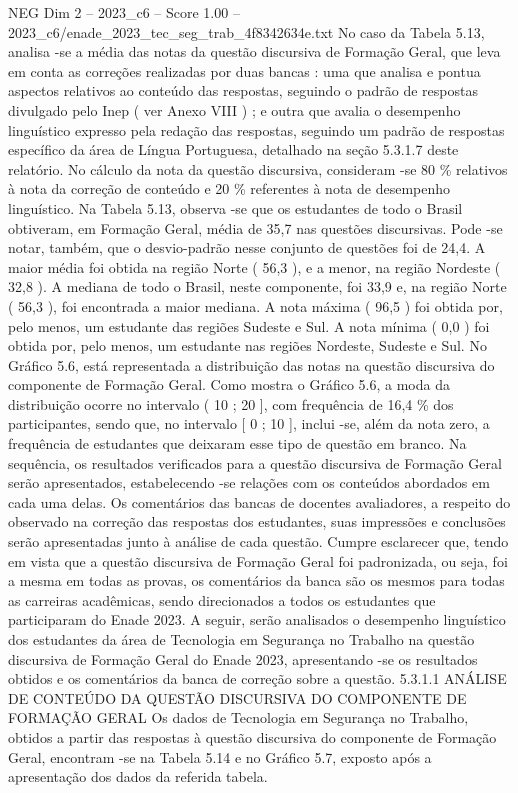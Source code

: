 \begin{textsample}{NEG Dim 2 – 2023\_c6 – Score 1.00 – 2023\_c6/enade\_2023\_tec\_seg\_trab\_4f8342634e.txt}
No caso da Tabela 5.13, analisa -se a média das notas da questão discursiva de Formação Geral, que leva em conta as correções realizadas por duas bancas : uma que analisa e pontua aspectos relativos ao conteúdo das respostas, seguindo o padrão de respostas divulgado pelo Inep ( ver Anexo VIII ) ; e outra que avalia o desempenho linguístico expresso pela redação das respostas, seguindo um padrão de respostas específico da área de Língua Portuguesa, detalhado na seção 5.3.1.7 deste relatório.
No cálculo da nota da questão discursiva, consideram -se 80 \% relativos à nota da correção de conteúdo e 20 \% referentes à nota de desempenho linguístico.
Na Tabela 5.13, observa -se que os estudantes de todo o Brasil obtiveram, em Formação Geral, média de 35,7 nas questões discursivas.
Pode -se notar, também, que o desvio-padrão nesse conjunto de questões foi de 24,4.
A maior média foi obtida na região Norte ( 56,3 ), e a menor, na região Nordeste ( 32,8 ).
A mediana de todo o Brasil, neste componente, foi 33,9 e, na região Norte ( 56,3 ), foi encontrada a maior mediana.
A nota máxima ( 96,5 ) foi obtida por, pelo menos, um estudante das regiões Sudeste e Sul.
A nota mínima ( 0,0 ) foi obtida por, pelo menos, um estudante nas regiões Nordeste, Sudeste e Sul.
No Gráfico 5.6, está representada a distribuição das notas na questão discursiva do componente de Formação Geral.
Como mostra o Gráfico 5.6, a moda da distribuição ocorre no intervalo ( 10 ; 20 ], com frequência de 16,4 \% dos participantes, sendo que, no intervalo [ 0 ; 10 ], inclui -se, além da nota zero, a frequência de estudantes que deixaram esse tipo de questão em branco.
Na sequência, os resultados verificados para a questão discursiva de Formação Geral serão apresentados, estabelecendo -se relações com os conteúdos abordados em cada uma delas.
Os comentários das bancas de docentes avaliadores, a respeito do observado na correção das respostas dos estudantes, suas impressões e conclusões serão apresentadas junto à análise de cada questão.
Cumpre esclarecer que, tendo em vista que a questão discursiva de Formação Geral foi padronizada, ou seja, foi a mesma em todas as provas, os comentários da banca são os mesmos para todas as carreiras acadêmicas, sendo direcionados a todos os estudantes que participaram do Enade 2023.
A seguir, serão analisados o desempenho linguístico dos estudantes da área de Tecnologia em Segurança no Trabalho na questão discursiva de Formação Geral do Enade 2023, apresentando -se os resultados obtidos e os comentários da banca de correção sobre a questão. 5.3.1.1 ANÁLISE DE CONTEÚDO DA QUESTÃO DISCURSIVA DO COMPONENTE DE FORMAÇÃO GERAL Os dados de Tecnologia em Segurança no Trabalho, obtidos a partir das respostas à questão discursiva do componente de Formação Geral, encontram -se na Tabela 5.14 e no Gráfico 5.7, exposto após a apresentação dos dados da referida tabela.

\end{textsample}

